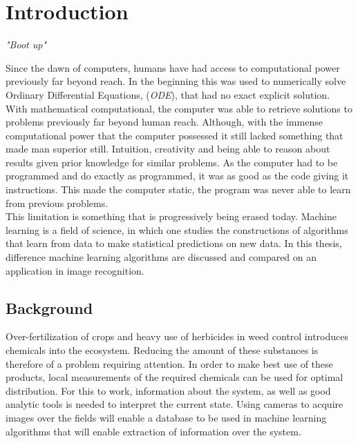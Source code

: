\chapter{Introduction}
\begin{center}
\vspace{-6ex}
\textit{"Boot up"}
\vspace{6ex}
\end{center}

Since the dawn of computers, humans have had access to computational power previously far beyond reach. In the beginning this was used to numerically solve Ordinary Differential Equations, (\textit{ODE}), that had no exact explicit solution. With mathematical computational, the computer was able to retrieve solutions to problems previously far beyond human reach. Although, with the immense computational power that the computer possessed it still lacked something that made man superior still. Intuition, creativity and being able to reason about results given prior knowledge for similar problems. As the computer had to be programmed and do exactly as programmed, it was as good as the code giving it instructions. This made the computer static, the program was never able to learn from previous problems.\\

This limitation is something that is progressively being erased today. Machine learning is a field of science, in which one studies the constructions of algorithms that learn from data to make statistical predictions on new data. In this thesis, difference machine learning algorithms are discussed and compared on an application in image recognition.

\section{Background}

Over-fertilization of crops and heavy use of herbicides in weed control introduces chemicals into the ecosystem. Reducing the amount of these substances is therefore of a problem requiring attention. In order to make best use of these products, local measurements of the required chemicals can be used for optimal distribution. For this to work, information about the system, as well as good analytic tools is needed to interpret the current state. Using cameras to acquire images over the fields will enable a database to be used in machine learning algorithms that will enable extraction of information over the system.

